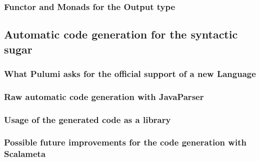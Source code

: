 \subsubsection{Functor and Monads for the Output type}

\subsection{Automatic code generation for the syntactic sugar}

\subsubsection{What Pulumi asks for the official support of a new Language}

\subsubsection{Raw automatic code generation with JavaParser}

\subsubsection{Usage of the generated code as a library}

\subsubsection{Possible future improvements for the code generation with Scalameta}
